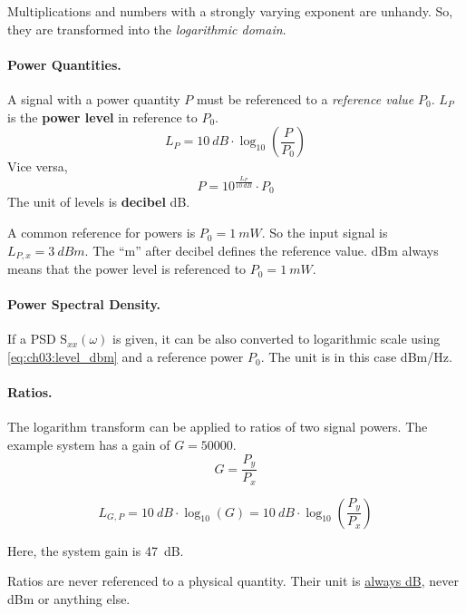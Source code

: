 \begin{refsection}
Multiplications and numbers with a strongly varying exponent are unhandy. So, they are transformed into the \emph{logarithmic domain}.

\paragraph{Power Quantities.}
A signal with a power quantity $P$ must be referenced to a \emph{reference value} $P_0$. $L_P$ is the  \textbf{power level} in reference to $P_0$.
\begin{equation}
	L_P = \SI{10}{dB} \cdot \log_{10} \left(\frac{P}{P_0}\right)
	\label{eq:ch03:level_dbm}
\end{equation}
Vice versa,
\begin{equation}
	P = 10^{\frac{L_P}{\SI{10}{dB}}} \cdot P_0
\end{equation}
The unit of levels is  \textbf{decibel} \si{dB}.

A common reference for powers is $P_0 = \SI{1}{mW}$. So the input signal is $L_{P,x} = \SI{3}{dBm}$. The ``m'' after decibel defines the reference value. \si{dBm} always means that the power level is referenced to $P_0 = \SI{1}{mW}$.

\paragraph{Power Spectral Density.}

If a \ac{PSD} $\mathrm{S}_{xx}(\omega)$ is given, it can be also converted to logarithmic scale using \eqref{eq:ch03:level_dbm} and a reference power $P_0$. The unit is in this case \si{dBm/Hz}.

\paragraph{Ratios.}
The logarithm transform can be applied to ratios of two signal powers. The example system has a gain of $G = 50000$.
\begin{equation}
	G = \frac{P_y}{P_x}
\end{equation}

\begin{equation}
	L_{G,P} = \SI{10}{dB} \cdot \log_{10} \left(G\right) = \SI{10}{dB} \cdot \log_{10} \left(\frac{P_y}{P_x}\right)
\end{equation}

Here, the system gain is \SI{47}{dB}.

\begin{attention}
	Ratios are never referenced to a physical quantity. Their unit is \underline{always \si{dB}}, never \si{dBm} or anything else.
\end{attention}


\end{refsection}
